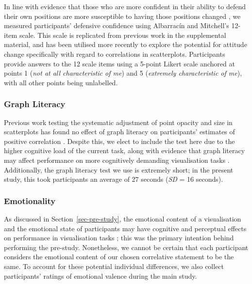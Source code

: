 \documentclass[sigconf]{acmart}
\begin{document}
In line with evidence that those who are more confident in their ability
to defend their own positions are more susceptible to having those
positions changed \citep{albarracin_2004}, we measured participants'
defensive confidence using Albarracín and Mitchell's
\citep{albarracin_2004} 12-item scale. This scale is replicated from
previous work in the supplemental material, and has been utilised more
recently \citep{markant_2023} to explore the potential for attitude
change specifically with regard to correlations in scatterplots.
Participants provide answers to the 12 scale items using a 5-point
Likert scale anchored at points 1 (\emph{not at all characteristic of
me}) and 5 (\emph{extremely characteristic of me}), with all other
points being unlabelled.

\subsubsection{Graph Literacy}\label{sec-graph-lit}

Previous work testing the systematic adjustment of point opacity and
size in scatterplots has found no effect of graph literacy on
participants' estimates of positive correlation
\citep{strain_2023, strain_2023b, strain_2024}. Despite this, we elect
to include the test here due to the higher cognitive load of the current
task, along with evidence that graph literacy may affect performance on
more cognitively demanding visualisation tasks
\citep{canham_2010, okan_2012}. Additionally, the graph literacy test we
use \citep{garcia_2016} is extremely short; in the present study, this
took participants an average of 27 seconds (\emph{SD} = 16 seconds).

\subsubsection{Emotionality}\label{sec-emotionality}

As discussed in Section~\ref{sec-pre-study}, the emotional content of a
visualisation and the emotional state of participants may have cognitive
and perceptual effects on performance in visualisation tasks
\citep{phelps_2006, harrison_2013, thoresen_2016}; this was the primary
intention behind performing the pre-study. Nonetheless, we cannot be
certain that each participant considers the emotional content of our
chosen correlative statement to be the same. To account for these
potential individual differences, we also collect participants' ratings
of emotional valence during the main study.
\end{document}
